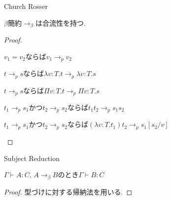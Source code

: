 \documentclass[18pt]{beamer}
\begin{document}
\begin{frame}{Church Rosser}
\begin{thm}
 $\beta$簡約$\rightarrow_{\beta}$は合流性を持つ.
\end{thm}
 
\begin{proof}
 \begin{description}
  \item $v_1 = v_2$ならば$v_1 \rightarrow_{p} v_2$
  \item $t \rightarrow_{p} s$ならば$\lambda v \colon T. t \rightarrow_{p} \lambda v \colon T. s$
  \item $t \rightarrow_{p} s$ならば$\Pi v \colon T. t \rightarrow_{p} \Pi v \colon T. s$
  \item $t_1 \rightarrow_{p} s_1$かつ$t_2 \rightarrow_{p} s_2$ならば$t_1 t_2 \rightarrow_{p} s_1 s_2$
  \item $t_1 \rightarrow_{p} s_1$かつ$t_2 \rightarrow_{p} s_2$ならば$(\lambda v \colon T. t_1) t_2 \rightarrow_{p} s_1[s_2/v]$
 \end{description}
\end{proof}
\end{frame}

\begin{frame}{Subject Reduction}
\begin{thm}
 $\Gamma \vdash A \colon C$, $A \rightarrow_\beta B$のとき$\Gamma \vdash B \colon C$
\end{thm}
\begin{proof}
 型づけに対する帰納法を用いる.
\end{proof}
\end{frame}
\end{document}
